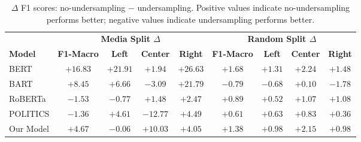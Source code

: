 \begin{table}[ht]
\centering
\small
\begin{tabular}{lcccccccc}
\toprule
& \multicolumn{4}{c}{\textbf{Media Split $\Delta$}} & \multicolumn{4}{c}{\textbf{Random Split $\Delta$}} \\
\cmidrule(lr){2-5} \cmidrule(lr){6-9}
\textbf{Model} & \textbf{F1-Macro} & \textbf{Left} & \textbf{Center} & \textbf{Right}
               & \textbf{F1-Macro} & \textbf{Left} & \textbf{Center} & \textbf{Right} \\
\midrule
BERT
  & $+16.83$ & $+21.91$ & $+1.94$  & $+26.63$
  & $+1.68$  & $+1.31$  & $+2.24$  & $+1.48$  \\
BART
  & $+8.45$  & $+6.66$  & \textit{$-3.09$} & $+21.79$
  & \textit{$-0.79$} & \textit{$-0.68$} & $+0.10$ & \textit{$-1.78$} \\
RoBERTa
  & \textit{$-1.53$} & \textit{$-0.77$} & $+1.48$ & $+2.47$
  & $+0.89$  & $+0.52$  & $+1.07$  & $+1.08$  \\
POLITICS
  & \textit{$-1.36$} & $+4.61$ & \textit{$-12.77$} & $+4.49$
  & $+0.61$ & $+0.63$ & $+0.83$ & $+0.36$ \\
Our Model
  & $+4.67$  & \textit{$-0.06$} & $+10.03$ & $+4.05$
  & $+1.38$ & $+0.98$ & $+2.15$ & $+0.98$ \\
\bottomrule
\end{tabular}
\caption{$\Delta$ F1 scores: no-undersampling $-$ undersampling. Positive values indicate no-undersampling performs better; negative values indicate undersampling performs better.}
\label{tab:delta}
\end{table}
